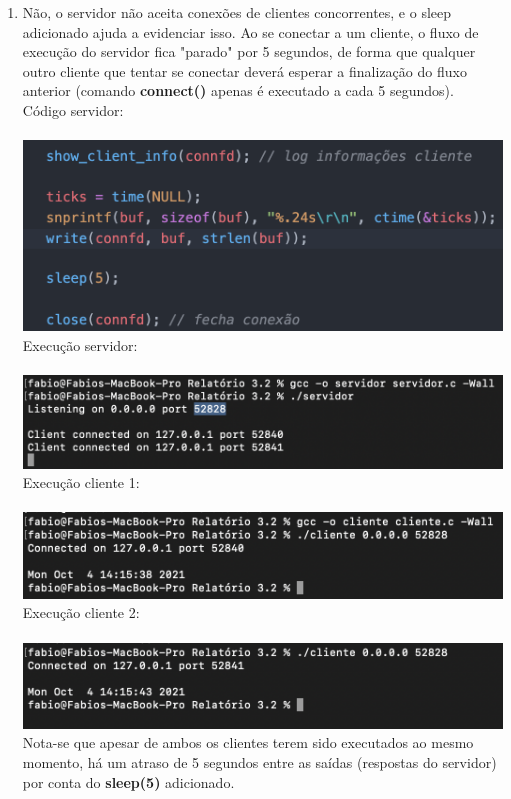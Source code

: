 \documentclass[12pt,a4paper]{report}
\begin{document}
\begin{enumerate}
    \item Não, o servidor não aceita conexões de clientes concorrentes, e o sleep adicionado ajuda a evidenciar isso. Ao se conectar a um cliente, o fluxo de execução do servidor fica "parado" por 5 segundos, de forma que qualquer outro cliente que tentar se conectar deverá esperar a finalização do fluxo anterior (comando \textbf{connect()} apenas é executado a cada 5 segundos).
    \\
    Código servidor:\\\\
    \includegraphics[width=13cm]{images/ex1-servidor-codigo.png}\\
    Execução servidor:\\\\
    \includegraphics[width=13cm]{images/ex1-servidor.png}\\
    Execução cliente 1:\\\\
    \includegraphics[width=13cm]{images/ex1-cliente1.png}\\
    Execução cliente 2:\\\\
    \includegraphics[width=13cm]{images/ex1-cliente2.png}\\
    Nota-se que apesar de ambos os clientes terem sido executados ao mesmo momento, há um atraso de 5 segundos entre as saídas (respostas do servidor) por conta do \textbf{sleep(5)} adicionado.
    

\end{enumerate}
\end{document}
